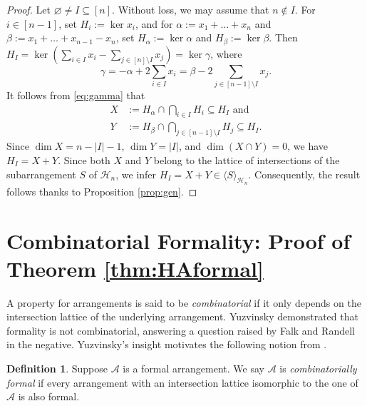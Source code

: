 \documentclass[12pt]{amsart}
\newcommand\CA{{\mathscr A}}
\newcommand\CH{{\mathscr H}}
\numberwithin{equation}{section}
\theoremstyle{plain}
\theoremstyle{definition}
\newtheorem{defn}[equation]{Definition}
\begin{document}
\begin{proof}
	Let $\varnothing \ne I \subseteq [n]$. Without loss, we may assume that $n \notin I$. For $i \in [n-1]$, set $H_i := \ker x_i$, and 
	for $\alpha := x_1 + \ldots + x_n$ and $\beta := x_1 + \ldots + x_{n-1} -  x_n$, set $H_\alpha := \ker \alpha$ and $H_\beta := \ker \beta$. 
	Then 
	$H_I = \ker \left(\sum_{i \in I}x_i - \sum_{j \in [n]\setminus I}x_j\right) = \ker \gamma$, where 
	\begin{equation}
		\label{eq:gamma}
		\gamma = - \alpha + 2 \sum_{i \in I}x_i = \beta - 2 \sum_{j \in [n-1]\setminus I}x_j.
	\end{equation}
	It follows from \eqref{eq:gamma} that 
		\begin{align*}
		X & := H_\alpha \cap \bigcap_{i \in I} H_i \subseteq H_I \text{ and } \\
		Y & :=  H_\beta \cap \bigcap_{j \in [n-1]\setminus I} H_j \subseteq H_I.
	\end{align*}
	Since $\dim X = n - |I| - 1$, $\dim Y = |I|$, and  $\dim (X \cap Y) = 0$, we have $H_I = X + Y$.
	Since both $X$ and $Y$ belong to the lattice of intersections of the subarrangement $S$ of $\CH_n$, we infer $H_I = X + Y \in \langle S \rangle_{\CH_n}$. 
	Consequently, the result follows thanks to Proposition \ref{prop:gen}.
	\end{proof}


\section{Combinatorial Formality: Proof of Theorem \ref{thm:HAformal}}
\label{s:thm:HAformal}

A property for arrangements is said to be \emph{combinatorial} if it only depends on the intersection lattice of the underlying arrangement.
Yuzvinsky \cite[Ex.~2.2]{yuzvinsky:obstruction} demonstrated that formality is not combinatorial, answering a question raised by Falk and Randell \cite{falkrandell:homotopy} in the negative.
Yuzvinsky's insight motivates the following notion from \cite{moellermueckschroehre:formal}.

\begin{defn}
	\label{def:combformal}
	Suppose $\CA$ is a formal arrangement. We say $\CA$ is \emph{combinatorially formal} if every arrangement with 
	an intersection lattice isomorphic to the one of
	$\CA$ is also formal.
\end{defn}
\end{document}
